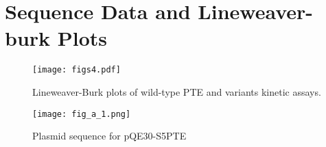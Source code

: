 \chapter{Sequence Data and Lineweaver-burk Plots}

\lstset{basicstyle=\footnotesize,breakatwhitespace=true,breaklines=true,title=\lstname}

\begin{figure}[htbp] \centering \texttt{[image: figs4.pdf]}
    \caption{Lineweaver-Burk plots of wild-type PTE and variants kinetic assays.}
    \label{fig:plot}
\end{figure}

\begin{figure}[h!] \centering \texttt{[image: fig\_a\_1.png]}
    \caption{Plasmid sequence for pQE30-S5PTE}
    \label{fig:plasmid_PTE-b}
\end{figure}
